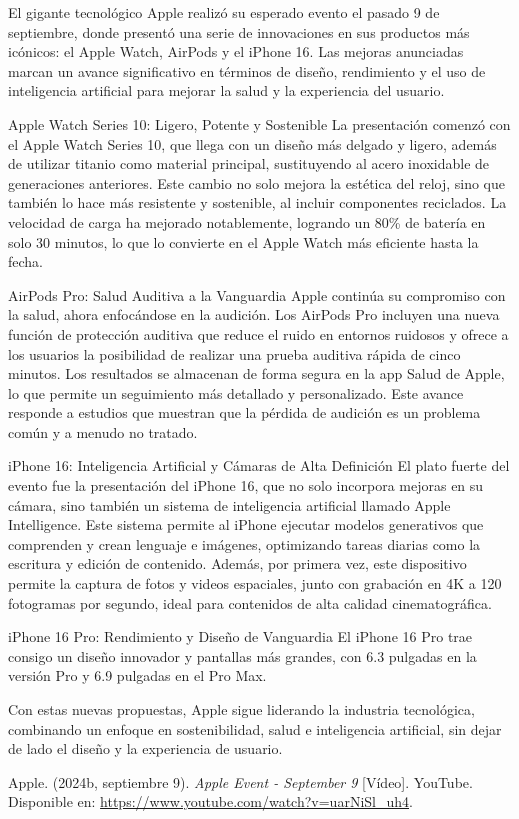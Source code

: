 \documentclass[letterpaper,12pt]{article}
\begin{document}
	{\small El gigante tecnológico Apple realizó su esperado evento el pasado 9 de septiembre, donde presentó una serie de innovaciones en sus productos más icónicos: el Apple Watch, AirPods y el iPhone 16. Las mejoras anunciadas marcan un avance significativo en términos de diseño, rendimiento y el uso de inteligencia artificial para mejorar la salud y la experiencia del usuario.
	
	Apple Watch Series 10: Ligero, Potente y Sostenible
	La presentación comenzó con el Apple Watch Series 10, que llega con un diseño más delgado y ligero, además de utilizar titanio como material principal, sustituyendo al acero inoxidable de generaciones anteriores. Este cambio no solo mejora la estética del reloj, sino que también lo hace más resistente y sostenible, al incluir componentes reciclados. La velocidad de carga ha mejorado notablemente, logrando un 80\% de batería en solo 30 minutos, lo que lo convierte en el Apple Watch más eficiente hasta la fecha.
		
	AirPods Pro: Salud Auditiva a la Vanguardia
	Apple continúa su compromiso con la salud, ahora enfocándose en la audición. Los AirPods Pro incluyen una nueva función de protección auditiva que reduce el ruido en entornos ruidosos y ofrece a los usuarios la posibilidad de realizar una prueba auditiva rápida de cinco minutos. Los resultados se almacenan de forma segura en la app Salud de Apple, lo que permite un seguimiento más detallado y personalizado. Este avance responde a estudios que muestran que la pérdida de audición es un problema común y a menudo no tratado.
		
	iPhone 16: Inteligencia Artificial y Cámaras de Alta Definición
	El plato fuerte del evento fue la presentación del iPhone 16, que no solo incorpora mejoras en su cámara, sino también un sistema de inteligencia artificial llamado Apple Intelligence. Este sistema permite al iPhone ejecutar modelos generativos que comprenden y crean lenguaje e imágenes, optimizando tareas diarias como la escritura y edición de contenido. Además, por primera vez, este dispositivo permite la captura de fotos y videos espaciales, junto con grabación en 4K a 120 fotogramas por segundo, ideal para contenidos de alta calidad cinematográfica.
		
	iPhone 16 Pro: Rendimiento y Diseño de Vanguardia
	El iPhone 16 Pro trae consigo un diseño innovador y pantallas más grandes, con 6.3 pulgadas en la versión Pro y 6.9 pulgadas en el Pro Max. 
		
	Con estas nuevas propuestas, Apple sigue liderando la industria tecnológica, combinando un enfoque en sostenibilidad, salud e inteligencia artificial, sin dejar de lado el diseño y la experiencia de usuario. 
	}
	
	\begin{thebibliography}{00}
		
	Apple. (2024b, septiembre 9). \emph{Apple Event - September 9} [Vídeo]. YouTube. Disponible en: \url{https://www.youtube.com/watch?v=uarNiSl_uh4}.

		
	\end{thebibliography}
\end{document}
